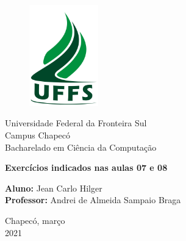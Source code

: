 \documentclass[a4paper, 12pt]{article}
\begin{document}

\begin{titlepage}
	\begin{center}
    	\begin{figure}[!ht]
        	\centering
        	\includegraphics[width=3cm]{./imgs/uffs.png}
    	\end{figure}
    
    	\Huge{Universidade Federal da Fronteira Sul}\\
    	\large{Campus Chapecó}\\ 
    	\large{Bacharelado em Ciência da Computação}\\ 
    	
    	\vspace{15pt}
        \vspace{95pt}
        
        \textbf{\LARGE{Exercícios indicados nas aulas 07 e 08}}\\
    	
        \vspace{3,5cm}
	\end{center}
	
	\begin{flushleft}
	    \begin{tabbing}
			\textbf{Aluno:} Jean Carlo Hilger \\
			\textbf{Professor:} Andrei de Almeida Sampaio Braga \\
        \end{tabbing}
    \end{flushleft}
	
	\vspace{1cm}
	
	\begin{center}
		\vspace{\fill}
		Chapecó, março\\
		2021
	\end{center}
\end{titlepage}
\end{document}
